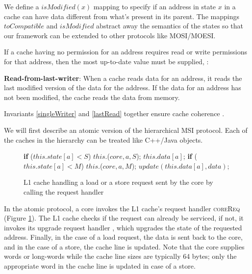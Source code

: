 We define a $isModified(x)$ mapping to specify if an address in state $x$ in a
cache can have data different from what's present in its parent. The mappings
$toCompatible$ and $isModified$ abstract away the semantics of the states so
that our framework can be extended to other protocols like MOSI/MOESI.

If a cache having no permission for an address requires read or write
permissions for that address, then the most up-to-date value must be supplied,
\ie:

\begin{theorem}
\textbf{Read-from-last-writer}: When a cache reads data for an address, it reads
the last modified version of the data for the address. If the data for an
address has not been modified, the cache reads the data from memory.
\label{lastRead}
\end{theorem}

Invariants \ref{singleWriter} and \ref{lastRead} together ensure cache coherence
\cite{Patterson}.

We will first describe an atomic version of the hierarchical MSI protocol. Each
of the caches in the hierarchy can be treated like C++/Java objects.

\begin{figure}
\small
\begin{algorithmic}
    \State \textbf{if} ($this.state[a] < S$)
    \State \;\;\;\; \call{} $this.$\uReq($core, a, S$);
    \State \send{} $this.data[a]$;
    \State \textbf{if} ($this.state[a] < M$)
    \State \;\;\;\; \call{} $this.$\uReq($core, a, M$);
    \State $update(this.data[a], data)$;
  \EndIf
\EndProc
\end{algorithmic}
\caption{L1 cache handling a load or a store request sent by the core by
calling the request handler}
\label{coreHandle}
\end{figure}

In the atomic protocol, a core invokes the L1 cache's request handler
\textsc{coreReq} (Figure \ref{coreHandle}). The L1 cache checks if the request
can already be serviced, if not, it invokes its upgrade request handler \uReq{},
which upgrades the state of the requested address. Finally, in the case of a
load request, the data is sent back to the core, and in the case of a store, the
cache line is updated. Note that the core supplies words or long-words while the
cache line sizes are typically 64 bytes; only the appropriate word in the cache
line is updated in case of a store.

